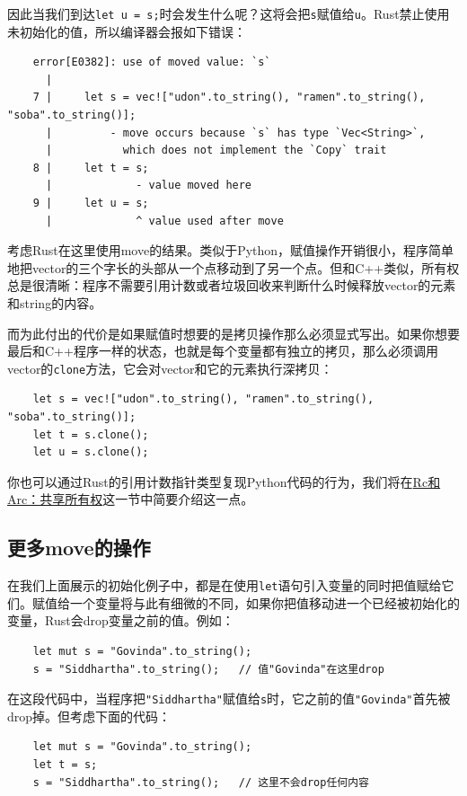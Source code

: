 因此当我们到达\texttt{let u = s;}时会发生什么呢？这将会把\texttt{s}赋值给\texttt{u}。Rust禁止使用未初始化的值，所以编译器会报如下错误：
\begin{verbatim}
    error[E0382]: use of moved value: `s`
      |
    7 |     let s = vec!["udon".to_string(), "ramen".to_string(), "soba".to_string()];
      |         - move occurs because `s` has type `Vec<String>`,
      |           which does not implement the `Copy` trait
    8 |     let t = s;
      |             - value moved here
    9 |     let u = s;
      |             ^ value used after move
\end{verbatim}

考虑Rust在这里使用move的结果。类似于Python，赋值操作开销很小，程序简单地把vector的三个字长的头部从一个点移动到了另一个点。但和C++类似，所有权总是很清晰：程序不需要引用计数或者垃圾回收来判断什么时候释放vector的元素和string的内容。

而为此付出的代价是如果赋值时想要的是拷贝操作那么必须显式写出。如果你想要最后和C++程序一样的状态，也就是每个变量都有独立的拷贝，那么必须调用vector的\texttt{clone}方法，它会对vector和它的元素执行深拷贝：
\begin{verbatim}
    let s = vec!["udon".to_string(), "ramen".to_string(), "soba".to_string()];
    let t = s.clone();
    let u = s.clone();
\end{verbatim}

你也可以通过Rust的引用计数指针类型复现Python代码的行为，我们将在\hyperref[rc]{Rc和Arc：共享所有权}这一节中简要介绍这一点。

\subsection{更多move的操作}

在我们上面展示的初始化例子中，都是在使用\texttt{let}语句引入变量的同时把值赋给它们。赋值给一个变量将与此有细微的不同，如果你把值移动进一个已经被初始化的变量，Rust会drop变量之前的值。例如：
\begin{verbatim}
    let mut s = "Govinda".to_string();
    s = "Siddhartha".to_string();   // 值"Govinda"在这里drop
\end{verbatim}

在这段代码中，当程序把\texttt{"Siddhartha"}赋值给\texttt{s}时，它之前的值\texttt{"Govinda"}首先被drop掉。但考虑下面的代码：
\begin{verbatim}
    let mut s = "Govinda".to_string();
    let t = s;
    s = "Siddhartha".to_string();   // 这里不会drop任何内容
\end{verbatim}

